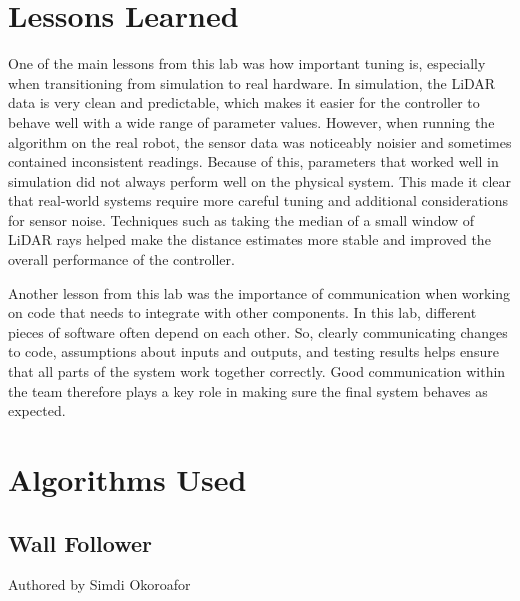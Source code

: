 \documentclass{article}
\begin{document}
\section{Lessons Learned}
One of the main lessons from this lab was how important tuning is, especially when transitioning from simulation to real hardware. In simulation, the LiDAR data is very clean and predictable, which makes it easier for the controller to behave well with a wide range of parameter values. However, when running the algorithm on the real robot, the sensor data was noticeably noisier and sometimes contained inconsistent readings. Because of this, parameters that worked well in simulation did not always perform well on the physical system. This made it clear that real-world systems require more careful tuning and additional considerations for sensor noise. Techniques such as taking the median of a small window of LiDAR rays helped make the distance estimates more stable and improved the overall performance of the controller.

Another lesson from this lab was the importance of communication when working on code that needs to integrate with other components. In this lab, different pieces of software often depend on each other. So, clearly communicating changes to code, assumptions about inputs and outputs, and testing results helps ensure that all parts of the system work together correctly. Good communication within the team therefore plays a key role in making sure the final system behaves as expected.
\section{Algorithms Used}

\subsection{Wall Follower}
Authored by Simdi Okoroafor \\\\
\end{document}
